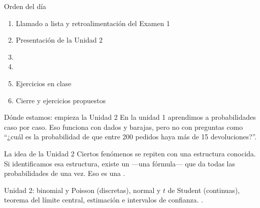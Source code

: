 \documentclass[aspectratio=169,10pt]{beamer}
\begin{document}
\portada

\begin{frame}{Orden del día}
  \begin{enumerate}
    \item Llamado a lista y retroalimentación del Examen 1
    \item Presentación de la Unidad 2
    \item {}
    \item {}
    \item Ejercicios en clase
    \item Cierre y ejercicios propuestos
  \end{enumerate}
\end{frame}

\begin{frame}{Dónde estamos: empieza la Unidad 2}
  En la unidad 1 aprendimos a  probabilidades caso por caso. Eso
  funciona con dados y barajas, pero no con preguntas como ``¿cuál es la
  probabilidad de que entre 200 pedidos haya más de 15 devoluciones?''.

  \vspace{0.2cm}
  \begin{alertblock}{La idea de la Unidad 2}
    \footnotesize
    Ciertos fenómenos se repiten con una estructura conocida. Si identificamos
    esa estructura, existe un  —una fórmula— que da todas las
    probabilidades de una vez. Eso es una .
  \end{alertblock}

  \vspace{0.15cm}
  {\footnotesize\color{uniGris} Unidad 2: binomial y Poisson (discretas),
  normal y $t$ de Student (continuas), teorema del límite central, estimación e
  intervalos de confianza. .}
\end{frame}

\end{document}
